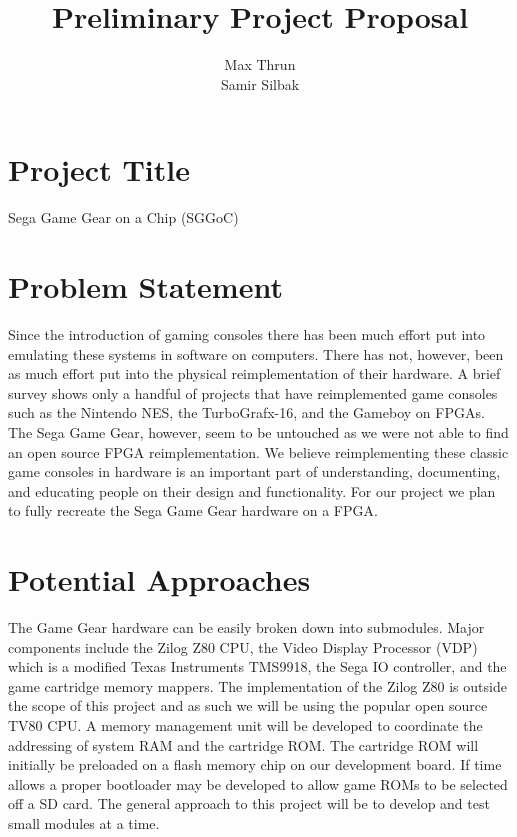 \documentclass[12pt]{article}
\title{Preliminary Project Proposal}
\author{ Max Thrun \\ Samir Silbak }
\begin{document}
\maketitle

\section*{Project Title}
Sega Game Gear on a Chip (SGGoC)

\section*{Problem Statement}
Since the introduction of gaming consoles there has been
much effort put into emulating these systems in software on computers. 
There has not, however, been as much effort put into the physical reimplementation of their hardware.
A brief survey shows only a handful of projects that have reimplemented game consoles such as the Nintendo NES, 
the TurboGrafx-16, and the Gameboy on FPGAs. The Sega Game Gear, however, seem to be untouched as we were not
able to find an open source FPGA reimplementation. We believe reimplementing these classic game consoles in hardware
is an important part of understanding, documenting, and educating people on their design and functionality. 
For our project we plan to fully recreate the Sega Game Gear hardware on a FPGA.

\section*{Potential Approaches}
The Game Gear hardware can be easily broken down into submodules. Major components include the Zilog Z80 CPU, 
the Video Display Processor (VDP) which is a modified Texas Instruments TMS9918, the Sega IO controller, and the
game cartridge memory mappers. The implementation of the Zilog Z80 is outside the scope of this project and as such
we will be using the popular open source TV80 CPU. A memory management unit will be developed to coordinate the 
addressing of system RAM and the cartridge ROM. The cartridge ROM will initially be preloaded on a flash memory chip on
our development board. If time allows a proper bootloader may be developed to allow game ROMs to be selected off a
SD card. The general approach to this project will be to develop and test small modules at a time.
\end{document}
